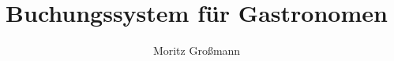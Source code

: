 


	
	\title{Buchungssystem für Gastronomen}
	\author{Moritz Großmann}
	\maketitle
	
	\newpage
	
	\tableofcontents
	
	
	
	
	
	
	
	
	
	
	
	
	
	
